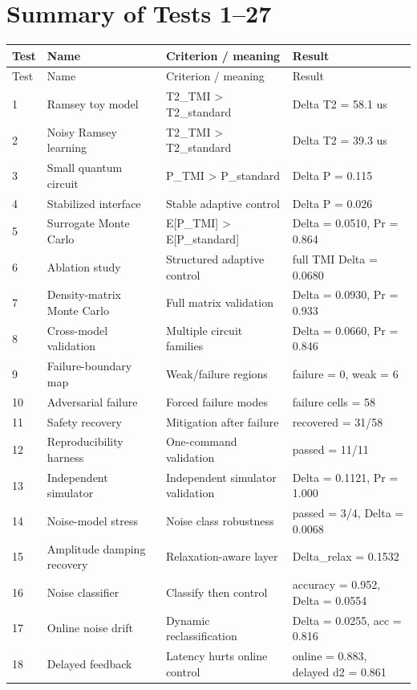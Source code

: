 \documentclass[12pt,a4paper]{article}
\begin{document}
\section{Summary of Tests 1--27}
\begin{longtable}{p{0.9cm}p{4.0cm}p{5.0cm}p{5.4cm}}
\toprule
Test & Name & Criterion / meaning & Result \\
\midrule
\endfirsthead
\toprule
Test & Name & Criterion / meaning & Result \\
\midrule
\endhead
1 & Ramsey toy model & T2\_TMI > T2\_standard & Delta T2 = 58.1 us \\
2 & Noisy Ramsey learning & T2\_TMI > T2\_standard & Delta T2 = 39.3 us \\
3 & Small quantum circuit & P\_TMI > P\_standard & Delta P = 0.115 \\
4 & Stabilized interface & Stable adaptive control & Delta P = 0.026 \\
5 & Surrogate Monte Carlo & E[P\_TMI] > E[P\_standard] & Delta = 0.0510, Pr = 0.864 \\
6 & Ablation study & Structured adaptive control & full TMI Delta = 0.0680 \\
7 & Density-matrix Monte Carlo & Full matrix validation & Delta = 0.0930, Pr = 0.933 \\
8 & Cross-model validation & Multiple circuit families & Delta = 0.0660, Pr = 0.846 \\
9 & Failure-boundary map & Weak/failure regions & failure = 0, weak = 6 \\
10 & Adversarial failure & Forced failure modes & failure cells = 58 \\
11 & Safety recovery & Mitigation after failure & recovered = 31/58 \\
12 & Reproducibility harness & One-command validation & passed = 11/11 \\
13 & Independent simulator & Independent simulator validation & Delta = 0.1121, Pr = 1.000 \\
14 & Noise-model stress & Noise class robustness & passed = 3/4, Delta = 0.0068 \\
15 & Amplitude damping recovery & Relaxation-aware layer & Delta\_relax = 0.1532 \\
16 & Noise classifier & Classify then control & accuracy = 0.952, Delta = 0.0554 \\
17 & Online noise drift & Dynamic reclassification & Delta = 0.0255, acc = 0.816 \\
18 & Delayed feedback & Latency hurts online control & online = 0.883, delayed d2 = 0.861 \\

\end{longtable}
\end{document}
